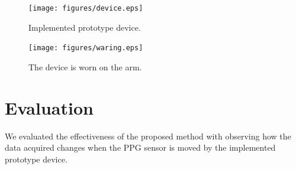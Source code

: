 \documentclass[sigconf, anonymous]{acmart}
\begin{document}
\begin{figure}[!t]
  \centering
  \texttt{[image: figures/device.eps]}
  \caption{Implemented prototype device.}
  \label{fig:device}
\end{figure}

\begin{figure}[!t]
  \centering
  \texttt{[image: figures/waring.eps]}
  \caption{The device is worn on the arm.}
  \label{fig:waring}
\end{figure}



\section{Evaluation}
\label{sec:evaluation}
We evaluated the effectiveness of the proposed method with observing how the data acquired changes when the PPG sensor is moved by the implemented prototype device.

\end{document}
